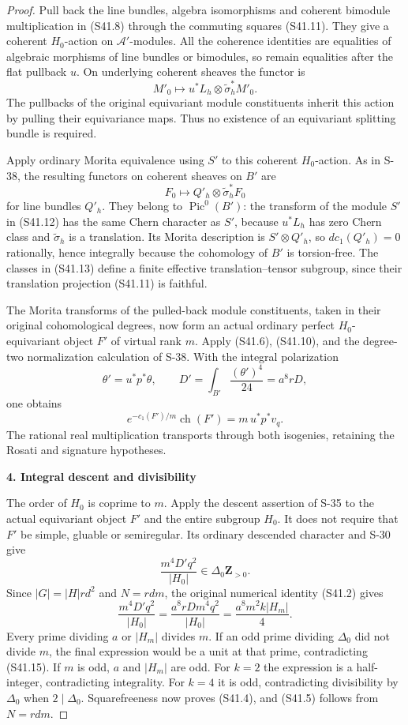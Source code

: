 \begin{proof}
Pull back the line bundles, algebra isomorphisms and coherent bimodule multiplication in (S41.8) through the commuting squares (S41.11). They give a coherent \(H_0\)-action on \(\mathscr A'\)-modules. All the coherence identities are equalities of algebraic morphisms of line bundles or bimodules, so remain equalities after the flat pullback \(u\). On underlying coherent sheaves the functor is \[
 M'_0\longmapsto u^*L_h\otimes\widetilde\sigma_h^*M'_0.
 \tag{S41.12}
\] The pullbacks of the original equivariant module constituents inherit this action by pulling their equivariance maps. Thus no existence of an equivariant splitting bundle is required.

Apply ordinary Morita equivalence using \(S'\) to this coherent \(H_0\)-action. As in S-38, the resulting functors on coherent sheaves on \(B'\) are \[
 F_0\longmapsto Q'_h\otimes\widetilde\sigma_h^*F_0
 \tag{S41.13}
\] for line bundles \(Q'_h\). They belong to \(\operatorname{Pic}^0(B')\): the transform of the module \(S'\) in (S41.12) has the same Chern character as \(S'\), because \(u^*L_h\) has zero Chern class and \(\widetilde\sigma_h\) is a translation. Its Morita description is \(S'\otimes Q'_h\), so \(d c_1(Q'_h)=0\) rationally, hence integrally because the cohomology of \(B'\) is torsion-free. The classes in (S41.13) define a finite effective translation--tensor subgroup, since their translation projection (S41.11) is faithful.

The Morita transforms of the pulled-back module constituents, taken in their original cohomological degrees, now form an actual ordinary perfect \(H_0\)-equivariant object \(F'\) of virtual rank \(m\). Apply (S41.6), (S41.10), and the degree-two normalization calculation of S-38. With the integral polarization \[
 \theta'=u^*p^*\theta,\qquad
 D'=\int_{B'}\frac{(\theta')^4}{24}=a^8rD,
\] one obtains \[
 e^{-c_1(F')/m}\operatorname{ch}(F')=m\,u^*p^*v_q.
 \tag{S41.14}
\] The rational real multiplication transports through both isogenies, retaining the Rosati and signature hypotheses.

\par

\medskip\noindent\textbf{4. Integral descent and divisibility}\quad

The order of \(H_0\) is coprime to \(m\). Apply the descent assertion of S-35 to the actual equivariant object \(F'\) and the entire subgroup \(H_0\). It does not require that \(F'\) be simple, gluable or semiregular. Its ordinary descended character and S-30 give \[
 \frac{m^4D'q^2}{|H_0|}\in\Delta_0\mathbf Z_{>0}.
 \tag{S41.15}
\] Since \(|G|=|H|rd^2\) and \(N=rdm\), the original numerical identity (S41.2) gives \[
 \frac{m^4D'q^2}{|H_0|}
  =\frac{a^8rD m^4q^2}{|H_0|}
  =\frac{a^8m^2 k |H_m|}{4}.
 \tag{S41.16}
\] Every prime dividing \(a\) or \(|H_m|\) divides \(m\). If an odd prime dividing \(\Delta_0\) did not divide \(m\), the final expression would be a unit at that prime, contradicting (S41.15). If \(m\) is odd, \(a\) and \(|H_m|\) are odd. For \(k=2\) the expression is a half-integer, contradicting integrality. For \(k=4\) it is odd, contradicting divisibility by \(\Delta_0\) when \(2\mid\Delta_0\). Squarefreeness now proves (S41.4), and (S41.5) follows from \(N=rdm\).
\end{proof}
